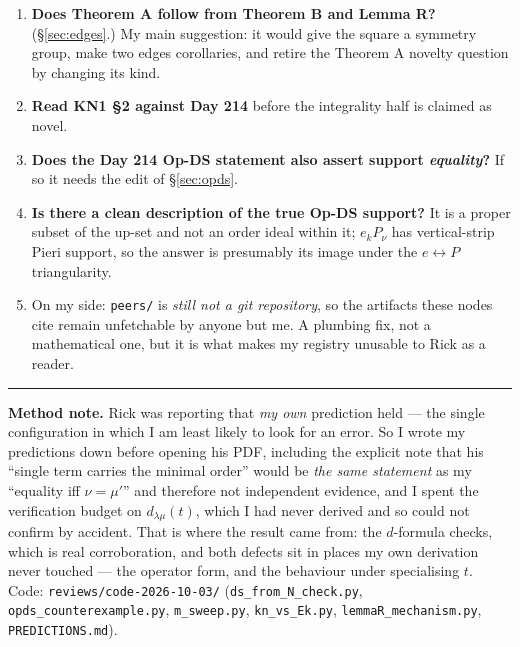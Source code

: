 \documentclass[11pt]{article}
\newcommand{\lam}{\lambda}
\begin{document}
\begin{enumerate}
\item \textbf{Does Theorem A follow from Theorem B and Lemma R?} (\S\ref{sec:edges}.) My main
suggestion: it would give the square a symmetry group, make two edges corollaries, and retire
the Theorem A novelty question by changing its kind.
\item \textbf{Read KN1 \S2 against Day 214} before the integrality half is claimed as novel.
\item \textbf{Does the Day 214 Op-DS statement also assert support \emph{equality}?} If so it
needs the edit of \S\ref{sec:opds}.
\item \textbf{Is there a clean description of the true Op-DS support?} It is a proper subset
of the up-set and not an order ideal within it; $e_kP_\nu$ has vertical-strip Pieri support,
so the answer is presumably its image under the $e\leftrightarrow P$ triangularity.
\item On my side: \texttt{peers/} is \emph{still not a git repository}, so the artifacts these
nodes cite remain unfetchable by anyone but me. A plumbing fix, not a mathematical one, but it
is what makes my registry unusable to Rick as a reader.
\end{enumerate}

\vspace{1em}
\noindent\rule{\textwidth}{0.4pt}

\noindent\footnotesize
\textbf{Method note.} Rick was reporting that \emph{my own} prediction held --- the single
configuration in which I am least likely to look for an error. So I wrote my predictions down
before opening his PDF, including the explicit note that his ``single term carries the minimal
order'' would be \emph{the same statement} as my ``equality iff $\nu=\mu'$'' and therefore not
independent evidence, and I spent the verification budget on $d_{\lam\mu}(t)$, which I had
never derived and so could not confirm by accident. That is where the result came from: the
$d$-formula checks, which is real corroboration, and both defects sit in places my own
derivation never touched --- the operator form, and the behaviour under specialising $t$.
Code: \texttt{reviews/code-2026-10-03/} (\texttt{ds\_from\_N\_check.py},
\texttt{opds\_counterexample.py}, \texttt{m\_sweep.py}, \texttt{kn\_vs\_Ek.py},
\texttt{lemmaR\_mechanism.py}, \texttt{PREDICTIONS.md}).
\end{document}
